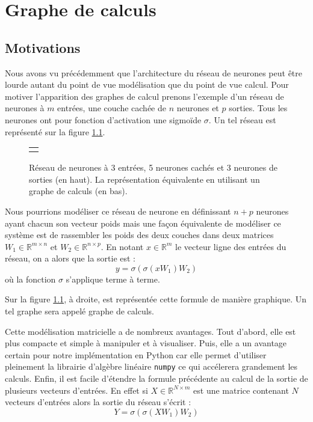 \chapter{Graphe de calculs}

\section{Motivations}

Nous avons vu précédemment que l'architecture du réseau de neurones peut être lourde autant du point de vue modélisation que du point de vue calcul. Pour motiver l'apparition des graphes de calcul prenons l'exemple d'un réseau de neurones à $m$ entrées, une couche cachée de $n$ neurones et $p$ sorties. Tous les neurones ont pour fonction d'activation une sigmoïde $\sigma$. Un tel réseau est représenté sur la figure \ref{reseau_3_5_3}.

\begin{figure}
\begin{center}
\begin{tabular}{c}
 \\
 \\
\end{tabular}
\end{center}
\caption{Réseau de neurones à 3 entrées, 5 neurones cachés et 3 neurones de sorties (en haut). La représentation équivalente en utilisant un graphe de calculs (en bas).}
\label{reseau_3_5_3}
\end{figure}

Nous pourrions modéliser ce réseau de neurone en définissant $n+p$ neurones ayant chacun son vecteur poids mais une façon équivalente de modéliser ce système est de rassembler les poids des deux couches dans deux matrices $W_1 \in \mathbb{R}^{m \times n}$ et $W_2 \in \mathbb{R}^{n \times p}$. En notant $x \in \mathbb{R}^m$ le vecteur ligne des entrées du réseau, on a alors que la sortie est :
\begin{equation}
y = \sigma(\sigma(xW_1)W_2)
\label{eq_3_5_3}
\end{equation}
où la fonction $\sigma$ s'applique terme à terme. 

Sur la figure \ref{reseau_3_5_3}, à droite, est représentée cette formule de manière graphique. Un tel graphe sera appelé graphe de calculs.

Cette modélisation matricielle a de nombreux avantages. Tout d'abord, elle est plus compacte et simple à manipuler et à visualiser. Puis, elle a un avantage certain pour notre implémentation en Python car elle permet d'utiliser pleinement la librairie d'algèbre linéaire \texttt{numpy} ce qui accélerera grandement les calculs. Enfin, il est facile d'étendre la formule précédente au calcul de la sortie de plusieurs vecteurs d'entrées. En effet si $X \in \mathbb{R}^{N \times m}$ est une matrice contenant $N$ vecteurs d'entrées alors la sortie du réseau s'écrit :
$$Y = \sigma(\sigma(XW_1)W_2)$$

